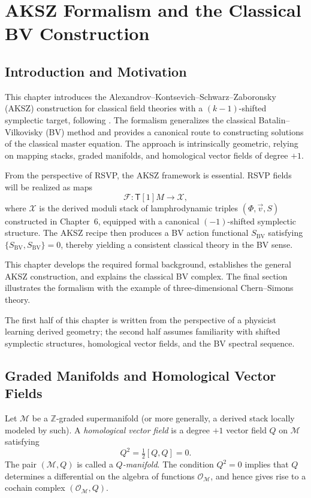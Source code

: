 \chapter{AKSZ Formalism and the Classical BV Construction}

\section{Introduction and Motivation}

This chapter introduces the Alexandrov--Kontsevich--Schwarz--Zaboronsky
(AKSZ) construction for classical field theories with
a $(k-1)$-shifted symplectic target, following
\cite{AKSZ97,CF01,CF07,PTVV13}.
The formalism generalizes the classical Batalin–Vilkovisky (BV) method
and provides a canonical route to constructing solutions of the
classical master equation. The approach is intrinsically geometric,
relying on mapping stacks, graded manifolds,
and homological vector fields of degree $+1$.

From the perspective of RSVP, the AKSZ framework is essential.
RSVP fields will be realized as maps
\[
\mathcal{F} \colon \mathsf{T}[1]M \longrightarrow \mathcal{X},
\]
where $\mathcal{X}$ is the derived moduli stack of
lamphrodynamic triples $(\Phi,\vec v,S)$ constructed in Chapter~6,
equipped with a canonical $(-1)$-shifted symplectic structure.
The AKSZ recipe then produces a BV action functional $S_{\text{BV}}$
satisfying $\{S_{\text{BV}},S_{\text{BV}}\}=0$, thereby yielding a
consistent classical theory in the BV sense.

This chapter develops the required formal background, establishes the
general AKSZ construction, and explains the classical BV complex.
The final section illustrates the formalism with the
example of three-dimensional Chern--Simons theory.

\medskip

The first half of this chapter is written from the perspective of a
physicist learning derived geometry; the second half assumes familiarity
with shifted symplectic structures, homological vector fields,
and the BV spectral sequence.


\section{Graded Manifolds and Homological Vector Fields}

Let $\mathcal{M}$ be a $\mathbb{Z}$-graded supermanifold (or more
generally, a derived stack locally modeled by such).
A \emph{homological vector field}
is a degree $+1$ vector field $Q$ on $\mathcal{M}$ satisfying
\[
Q^2 = \tfrac12[Q,Q]=0.
\]
The pair $(\mathcal{M},Q)$ is called a \emph{$Q$-manifold}.
The condition $Q^2=0$ implies that $Q$ determines a differential on
the algebra of functions $\mathcal{O}_{\mathcal{M}}$, and hence gives
rise to a cochain complex
$(\mathcal{O}_{\mathcal{M}},Q)$.

